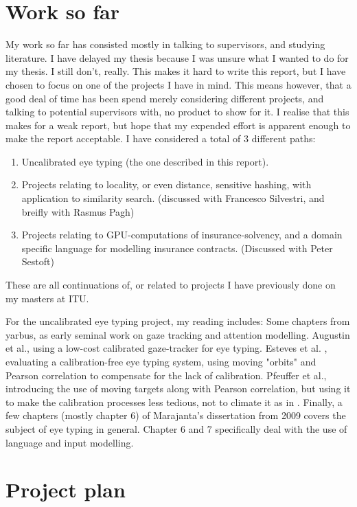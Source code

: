 \documentclass[a4paper, titlepage, 12pt, draft]{article}
\renewcommand{\%}{\scalebox{.9}{\oldpct}}
\begin{document}
\section*{Work so far}
My work so far has consisted mostly in talking to supervisors, and studying
literature. I have delayed my thesis because I was unsure what I wanted to do
for my thesis. I still don't, really. This makes it hard to write this report,
but I have chosen to focus on one of the projects I have in mind. This means
however, that a good deal of time has been spend merely considering different
projects, and talking to potential supervisors with, no product to show for it.
I realise that this makes for a weak report, but hope that my expended effort
is apparent enough to make the report acceptable. I have considered a total of 3
different paths:

\begin{enumerate}
	\item Uncalibrated eye typing (the one described in this report).
	\item Projects relating to locality, or even distance, sensitive
	hashing, with application to similarity search. (discussed with Francesco
	Silvestri, and breifly with Rasmus Pagh)
	\item Projects relating to GPU-computations of insurance-solvency, and
	a domain specific language for modelling insurance contracts. (Discussed with Peter Sestoft)
\end{enumerate}

These are all continuations of, or related to projects I have previously done
on my masters at ITU.

For the uncalibrated eye typing project, my reading includes: Some chapters from
yarbus\cite{yarbus}, as early seminal work on gaze tracking and attention
modelling. Augustin et al.\cite{witzner}, using a low-cost calibrated
gaze-tracker for eye typing. Esteves et al. \cite{orbits}, evaluating a
calibration-free eye typing system, using moving "orbits" and Pearson
correlation to compensate for the lack of calibration. Pfeuffer et
al.\cite{pursuit}, introducing the use of moving targets along with Pearson
correlation, but using it to make the calibration processes less tedious, not to
climate it as in \cite{orbits}. Finally, a few chapters (mostly chapter 6) of
Marajanta's dissertation from 2009\cite{majaranta} covers the subject of eye
typing in general. Chapter 6 and 7 specifically deal with the use of language
and input modelling.

\section*{Project plan}
\end{document}
